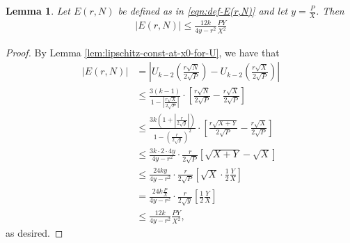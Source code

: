 \documentclass[12pt,letterpaper,reqno]{amsart}
\theoremstyle{plain}
\newtheorem{lemma}[theorem]{Lemma}
\theoremstyle{definition}
\numberwithin{equation}{section}
\numberwithin{figure}{section}
\numberwithin{table}{section}
\newcommand{\lrabs}[1]{\!\left\lvert #1 \right\lvert}
\newcommand{\lrp}[1]{\!\left(#1\right)}
\newcommand{\lrb}[1]{\!\left[#1\right]}
\begin{document}
\begin{lemma} \label{lem:E(r,N)-bound}
    Let $E(r,N)$ be defined as in \eqref{eqn:def-E(r,N)} and let $y = \frac{P}{X}$. Then
    \begin{align}
        |E(r,N)| \le \frac{12k}{4y-r^2} \frac{PY}{X^2}
    \end{align}
\end{lemma}
\begin{proof}
    By Lemma \ref{lem:lipschitz-const-at-x0-for-U}, we have that
    \begin{align}
        |E(r,N)| 
        &=
        \lrabs{
        U_{k-2}\lrp{\frac{r \sqrt{N}}{2\sqrt{P}}}-
        U_{k-2}\lrp{\frac{r\sqrt{X}}{2\sqrt{P}}}
        }
        \\
        &\le \frac{3(k-1)}{1-\lrabs{\frac{r \sqrt X}{2 \sqrt P}}} \cdot \lrb{\frac{r\sqrt N}{2 \sqrt P} - \frac{r\sqrt X}{2 \sqrt P}} \\
        &\le \frac{3k\lrp{1+\lrabs{\frac{r}{2\sqrt y}}}}{1-\lrp{\frac{r}{2 \sqrt y}}^2} \cdot \lrb{\frac{r\sqrt{X+Y}}{2 \sqrt P} - \frac{r\sqrt X}{2 \sqrt P}} \\
        &\le \frac{3k \cdot 2 \cdot 4y}{4y-r^2} \cdot \frac{r}{2 \sqrt P} \lrb{\sqrt{X+Y} - \sqrt{X}} \\
        &\le \frac{24ky}{4y-r^2} \cdot \frac{r}{2 \sqrt P} \lrb{\sqrt{X} \cdot \frac{1}{2} \frac{Y}{X}} \\
        &= \frac{24k \frac PX}{4y-r^2} \cdot \frac{r}{2 \sqrt y} \lrb{\frac{1}{2} \frac{Y}{X}} \\
        &\le \frac{12k}{4y-r^2} \frac{PY}{X^2},
    \end{align}
    as desired.
\end{proof}
\end{document}
